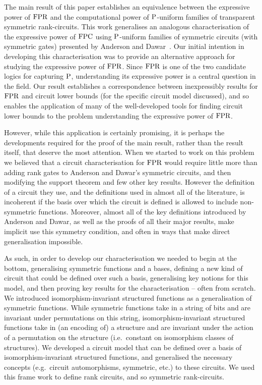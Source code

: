 \documentclass[../paper.tex]{subfiles}
\begin{document}
The main result of this paper establishes an equivalence between the expressive
power of $\text{\upshape FPR}$ and the computational power of $\mathrm{P}$-uniform families of
transparent symmetric rank-circuits. This work generalises an analogous
characterisation of the expressive power of $\text{\upshape FPC}$ using $\mathrm{P}$-uniform families
of symmetric circuits (with symmetric gates) presented by Anderson and
Dawar~\cite{AndersonD17}. Our initial intention in developing this
characterisation was to provide an alternative approach for studying the
expressive power of $\text{\upshape FPR}$. Since $\text{\upshape FPR}$ is one of the two candidate logics for
capturing $\mathrm{P}$, understanding its expressive power is a central question in the
field. Our result establishes a correspondence between inexpressibly results for
$\text{\upshape FPR}$ and circuit lower bounds (for the specific circuit model discussed), and
so enables the application of many of the well-developed tools for finding
circuit lower bounds to the problem understanding the expressive power of
$\text{\upshape FPR}$.

However, while this application is certainly promising, it is perhaps the
developments required for the proof of the main result, rather than the result
itself, that deserve the most attention. When we started to work on this problem
we believed that a circuit characterisation for $\text{\upshape FPR}$ would require little more
than adding rank gates to Anderson and Dawar's symmetric circuits, and then
modifying the support theorem and few other key results. However the definition
of a circuit they use, and the definitions used in almost all of the literature,
is incoherent if the basis over which the circuit is defined is allowed to
include non-symmetric functions. Moreover, almost all of the key definitions
introduced by Anderson and Dawar, as well as the proofs of all their major
results, make implicit use this symmetry condition, and often in ways that make
direct generalisation impossible.

As such, in order to develop our characterisation we needed to begin at the
bottom, generalising symmetric functions and a bases, defining a new kind of
circuit that could be defined over such a basis, generalising key notions for
this model, and then proving key results for the characterisation -- often from
scratch. We introduced isomorphism-invariant structured functions as a
generalisation of symmetric functions. While symmetric functions take in a
string of bits and are invariant under permutations on this string,
isomorphism-invariant structured functions take in (an encoding of) a structure
and are invariant under the action of a permutation on the structure (i.e.\
constant on isomorphism classes of structures). We developed a circuit model
that can be defined over a basis of isomorphism-invariant structured functions,
and generalised the necessary concepts (e.g.\ circuit automorphisms, symmetric,
etc.) to these circuits. We used this frame work to define rank circuits, and so
symmetric rank-circuits.
\end{document}
